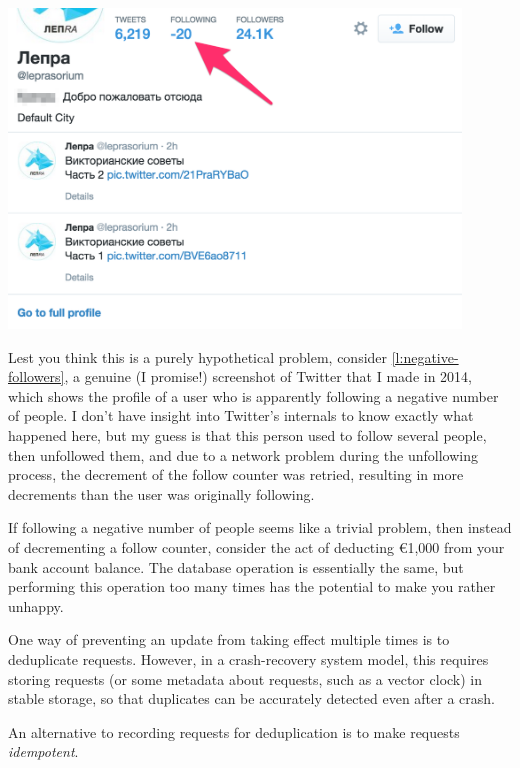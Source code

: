\begin{frame}[plain]
    \label{s:negative-followers}
    \includegraphics[width=12cm]{images/negative-followers.png}
\end{frame}
\label{l:negative-followers}

Lest you think this is a purely hypothetical problem, consider \autoref{l:negative-followers}, a genuine (I promise!) screenshot of Twitter that I made in 2014, which shows the profile of a user who is apparently following a negative number of people.
I don't have insight into Twitter's internals to know exactly what happened here, but my guess is that this person used to follow several people, then unfollowed them, and due to a network problem during the unfollowing process, the decrement of the follow counter was retried, resulting in more decrements than the user was originally following.

If following a negative number of people seems like a trivial problem, then instead of decrementing a follow counter, consider the act of deducting {\euro}1,000 from your bank account balance.
The database operation is essentially the same, but performing this operation too many times has the potential to make you rather unhappy.

One way of preventing an update from taking effect multiple times is to deduplicate requests.
However, in a crash-recovery system model, this requires storing requests (or some metadata about requests, such as a vector clock) in stable storage, so that duplicates can be accurately detected even after a crash.

An alternative to recording requests for deduplication is to make requests \emph{idempotent}.

